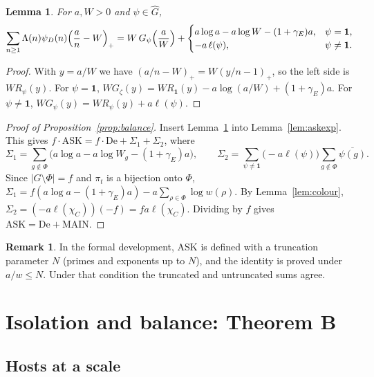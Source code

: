 \documentclass[11pt]{amsart}
\newcommand{\gE}{\gamma_{E}}
\newcommand{\ASK}{\mathrm{ASK}}
\newcommand{\MAIN}{\mathrm{MAIN}}
\newcommand{\De}{\mathrm{De}}
\newcommand{\Gh}{\widehat{G}}
\newcommand{\pa}{\pi}
\theoremstyle{plain}
\newtheorem{lemma}[theorem]{Lemma}
\theoremstyle{definition}
\newtheorem{remark}[theorem]{Remark}
\numberwithin{equation}{section}
\begin{document}
\begin{lemma}\label{lem:cut}
For $a,W>0$ and $\psi\in\Gh$,
\[
\sum_{n\ge1}\Lambda(n)\psi_D(n)\Bigl(\frac an-W\Bigr)_{+}=W\,G_\psi\Bigl(\frac aW\Bigr)+
\begin{cases}a\log a-a\log W-(1+\gE)a,&\psi=\mathbf 1,\\ -a\,\ell(\psi),&\psi\neq\mathbf 1.\end{cases}
\]
\end{lemma}

\begin{proof}
With $y=a/W$ we have $(a/n-W)_+=W(y/n-1)_+$, so the left side is $W R_\psi(y)$. For
$\psi=\mathbf 1$, $WG_\zeta(y)=WR_{\mathbf 1}(y)-a\log(a/W)+(1+\gE)a$. For $\psi\neq\mathbf 1$,
$WG_\psi(y)=WR_\psi(y)+a\ell(\psi)$.
\end{proof}

\begin{proof}[Proof of Proposition~\ref{prop:balance}]
Insert Lemma~\ref{lem:cut} into Lemma~\ref{lem:askexp}. This gives
$f\cdot\ASK=f\cdot\De+\Sigma_1+\Sigma_2$, where
\[
\Sigma_1=\sum_{g\notin\Phi}\bigl(a\log a-a\log W_g-(1+\gE)a\bigr),\qquad
\Sigma_2=\sum_{\psi\neq\mathbf 1}\bigl(-a\ell(\psi)\bigr)\sum_{g\notin\Phi}\overline{\psi(g)}.
\]
Since $|G\setminus\Phi|=f$ and $\pa_t$ is a bijection onto $\Phi$,
$\Sigma_1=f(a\log a-(1+\gE)a)-a\sum_{\rho\in\Phi}\log w(\rho)$. By Lemma~\ref{lem:colour},
$\Sigma_2=(-a\ell(\chi_C))(-f)=fa\ell(\chi_C)$. Dividing by $f$ gives $\ASK=\De+\MAIN$.
\end{proof}

\begin{remark}
In the formal development, $\ASK$ is defined with a truncation parameter $N$ (primes and exponents
up to $N$), and the identity is proved under $a/w\le N$. Under that condition the truncated and
untruncated sums agree.
\end{remark}
\section{Isolation and balance: Theorem B}\label{sec:B}

\subsection{Hosts at a scale}
\end{document}

